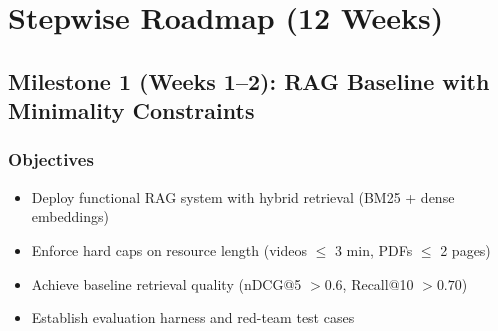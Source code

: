\documentclass[11pt,letterpaper]{article}
\begin{document}
\newpage

\section{Stepwise Roadmap (12 Weeks)}

\subsection{Milestone 1 (Weeks 1--2): RAG Baseline with Minimality Constraints}

\subsubsection{Objectives}
\begin{itemize}
\item Deploy functional RAG system with hybrid retrieval (BM25 + dense embeddings)
\item Enforce hard caps on resource length (videos $\leq$ 3 min, PDFs $\leq$ 2 pages)
\item Achieve baseline retrieval quality (nDCG@5 $> 0.6$, Recall@10 $> 0.70$)
\item Establish evaluation harness and red-team test cases
\end{itemize}
\end{document}
